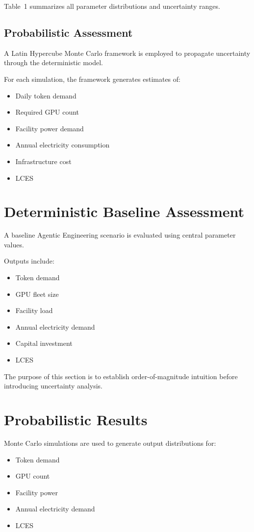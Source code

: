 Table~1 summarizes all parameter distributions and uncertainty ranges.

\subsection{Probabilistic Assessment}

A Latin Hypercube Monte Carlo framework is employed to propagate uncertainty through the deterministic model.

For each simulation, the framework generates estimates of:

\begin{itemize}
\item Daily token demand
\item Required GPU count
\item Facility power demand
\item Annual electricity consumption
\item Infrastructure cost
\item LCES
\end{itemize}

\section{Deterministic Baseline Assessment}

A baseline Agentic Engineering scenario is evaluated using central parameter values.

Outputs include:

\begin{itemize}
\item Token demand
\item GPU fleet size
\item Facility load
\item Annual electricity demand
\item Capital investment
\item LCES
\end{itemize}

The purpose of this section is to establish order-of-magnitude intuition before introducing uncertainty analysis.

\section{Probabilistic Results}

Monte Carlo simulations are used to generate output distributions for:

\begin{itemize}
\item Token demand
\item GPU count
\item Facility power
\item Annual electricity demand
\item LCES
\end{itemize}

